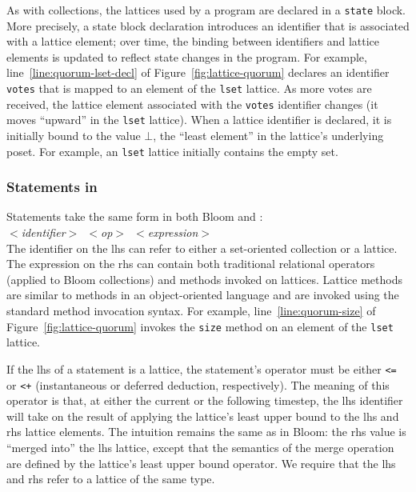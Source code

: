 As with collections, the lattices used by a \lang program are declared in a
\texttt{state} block. More precisely, a state block declaration introduces an
identifier that is associated with a lattice element; over time, the binding
between identifiers and lattice elements is updated to reflect state changes in
the program. For example, line~\ref{line:quorum-lset-decl} of
Figure~\ref{fig:lattice-quorum} declares an identifier \texttt{votes} that is
mapped to an element of the \texttt{lset} lattice. As more votes are received,
the lattice element associated with the \texttt{votes} identifier changes (it
moves ``upward'' in the \texttt{lset} lattice). When a lattice identifier is
declared, it is initially bound to the value $\bot$, the ``least element'' in
the lattice's underlying poset. For example, an \texttt{lset} lattice initially
contains the empty set.

\subsubsection{Statements in \lang}
Statements take the same form in both Bloom and \lang: \\ \noindent
\mbox{\hspace{0.25in}\emph{$<$identifier$>$ $<$op$>$
    $<$expression$>$}}\\ \noindent
The identifier on the lhs can refer to either a set-oriented collection or a
lattice. The expression on the rhs can contain both traditional relational
operators (applied to Bloom collections) and methods invoked on lattices.
Lattice methods are similar to methods in an object-oriented language and are
invoked using the standard method invocation syntax. For example,
line~\ref{line:quorum-size} of Figure~\ref{fig:lattice-quorum} invokes the
\texttt{size} method on an element of the \texttt{lset} lattice.

If the lhs of a statement is a lattice, the statement's operator must be either
\verb|<=| or \verb|<+| (instantaneous or deferred deduction, respectively). The
meaning of this operator is that, at either the current or the following
timestep, the lhs identifier will take on the result of applying the lattice's
least upper bound to the lhs and rhs lattice elements. The intuition remains the
same as in Bloom: the rhs value is ``merged into'' the lhs lattice, except that
the semantics of the merge operation are defined by the lattice's least upper
bound operator. We require that the lhs and rhs refer to a lattice of the same
type.

